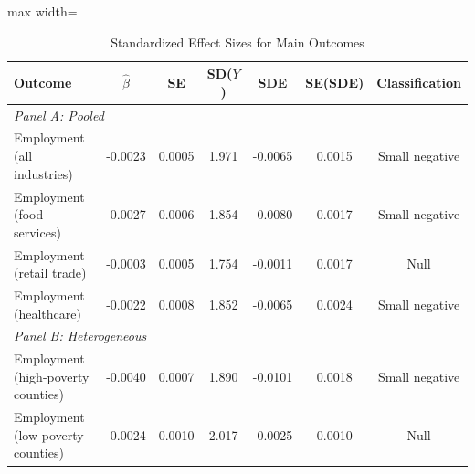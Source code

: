 \begin{table}[H]
\centering
\caption{Standardized Effect Sizes for Main Outcomes}
\label{tab:sde}
\begin{adjustbox}{max width=\textwidth}
\begin{threeparttable}
\begin{tabular}{lcccccc}
\toprule
Outcome & $\hat{\beta}$ & SE & SD($Y$) & SDE & SE(SDE) & Classification \\
\midrule
\multicolumn{7}{l}{\textit{Panel A: Pooled}} \\
Employment (all industries) & -0.0023 & 0.0005 & 1.971 & -0.0065 & 0.0015 & Small negative \\
Employment (food services) & -0.0027 & 0.0006 & 1.854 & -0.0080 & 0.0017 & Small negative \\
Employment (retail trade) & -0.0003 & 0.0005 & 1.754 & -0.0011 & 0.0017 & Null \\
Employment (healthcare) & -0.0022 & 0.0008 & 1.852 & -0.0065 & 0.0024 & Small negative \\
\midrule
\multicolumn{7}{l}{\textit{Panel B: Heterogeneous}} \\
Employment (high-poverty counties) & -0.0040 & 0.0007 & 1.890 & -0.0101 & 0.0018 & Small negative \\
Employment (low-poverty counties) & -0.0024 & 0.0010 & 2.017 & -0.0025 & 0.0010 & Null \\
\bottomrule
\end{tabular}
\begin{tablenotes}[flushleft]
\scriptsize

\end{tablenotes}
\end{threeparttable}
\end{adjustbox}
\end{table}
